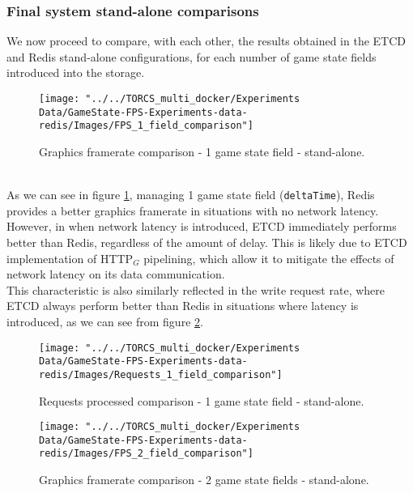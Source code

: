 \subsubsection{Final system stand-alone comparisons}
We now proceed to compare, with each other, the results obtained in the ETCD and Redis stand-alone configurations, for each number of game state fields introduced into the storage. \\
\begin{figure}[h!]
	\centering
	\texttt{[image: "../../TORCS\_multi\_docker/Experiments Data/GameState-FPS-Experiments-data-redis/Images/FPS\_1\_field\_comparison"]}
	\caption[Graphics framerate comparison - 1 game state field - stand-alone]{Graphics framerate comparison - 1 game state field - stand-alone.}
	\label{fig:fps-1-field-comparison-standalone}
\end{figure}
\\ As we can see in figure \ref{fig:fps-1-field-comparison-standalone}, managing 1 game state field (\texttt{deltaTime}), Redis provides a better graphics framerate in situations with no network latency. However, in when network latency is introduced, ETCD immediately performs better than Redis, regardless of the amount of delay. This is likely due to ETCD implementation of HTTP$_G$ pipelining, which allow it to mitigate the effects of network latency on its data communication. \\
This characteristic is also similarly reflected in the write request rate, where ETCD always perform better than Redis in situations where latency is introduced, as we can see from figure \ref{fig:requests-1-field-comparison-standalone}.
\begin{figure}[h!]
	\centering
	\texttt{[image: "../../TORCS\_multi\_docker/Experiments Data/GameState-FPS-Experiments-data-redis/Images/Requests\_1\_field\_comparison"]}
	\caption[Requests processed comparison - 1 game state field - stand-alone]{Requests processed comparison - 1 game state field - stand-alone.}
	\label{fig:requests-1-field-comparison-standalone}
\end{figure}
\begin{figure}[h!]
	\centering
	\texttt{[image: "../../TORCS\_multi\_docker/Experiments Data/GameState-FPS-Experiments-data-redis/Images/FPS\_2\_field\_comparison"]}
	\caption[Graphics framerate comparison - 2 game state fields - stand-alone]{Graphics framerate comparison - 2 game state fields - stand-alone.}
	\label{fig:fps-2-field-comparison-standalone}
\end{figure}
